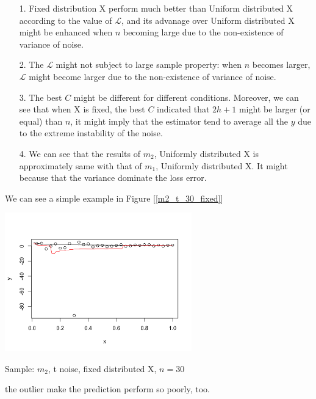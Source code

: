 \documentclass[twoside]{article}
\begin{document}
\begin{itemize}
  \item[1.] Fixed distribution X perform much better than Uniform distributed X according to the value of $\mathcal{L}$, and its advanage over Uniform distributed X might be enhanced when $n$ becoming large due to the non-existence of variance of noise.
  \item[2.] The $\mathcal{L}$ might not subject to large sample property: when $n$ becomes larger, $\mathcal{L}$ might become larger due to the non-existence of variance of noise.
  \item[3.] The best $C$ might be different for different conditions. Moreover, we can see that when X is fixed, the best $C$ indicated that $2h+1$ might be larger (or equal) than $n$, it might imply that the estimator tend to average all the $y$ due to the extreme instability of the noise.
  \item[4.] We can see that the results of $m_2$, Uniformly distributed X is approximately same with that of $m_1$, Uniformly distributed X. It might because that the variance dominate the loss error.
\end{itemize}

We can see a simple example in Figure [\ref{m2_t_30_fixed}]

\begin{center}
\makeatletter
\def\@captype{figure}
\makeatother
\includegraphics [height=6cm]{code/m2_t_30_fixed.png}
\caption{Sample: $m_2$, t noise, fixed distributed X, $n=30$}
\label{m2_t_30_fixed}
\end{center}

the outlier make the prediction perform so poorly, too.
\end{document}

